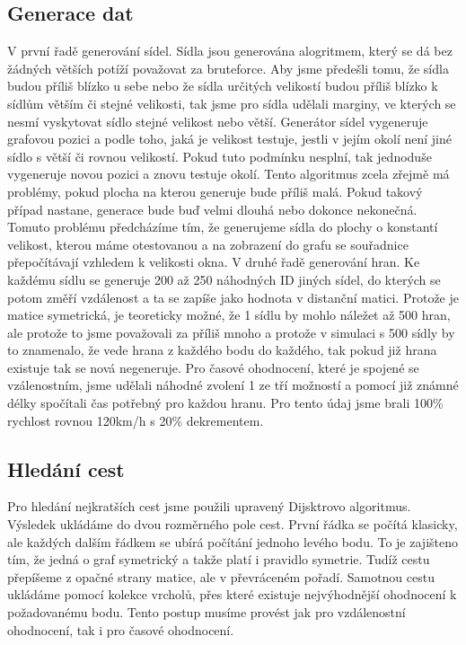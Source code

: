 \documentclass[ 12pt, a4paper]{article}
\begin{document}
\subsection{Generace dat}
V první řadě generování sídel. Sídla jsou generována alogritmem, který se dá bez žádných větších potíží považovat za bruteforce. Aby jsme předešli tomu, že sídla budou příliš blízko u sebe nebo že sídla určitých velikostí budou příliš blízko k sídlům větším či stejné velikosti, tak jsme pro sídla udělali marginy, ve kterých se nesmí vyskytovat sídlo stejné velikost nebo větší. Generátor sídel vygeneruje grafovou pozici a podle toho, jaká je velikost testuje, jestli v jejím okolí není jiné sídlo s větší či rovnou velikostí. Pokud tuto podmínku nesplní, tak jednoduše vygeneruje novou pozici a znovu testuje okolí. Tento algoritmus zcela zřejmě má problémy, pokud plocha na kterou generuje bude příliš malá. Pokud takový případ nastane, generace bude buď velmi dlouhá nebo dokonce nekonečná. Tomuto problému předcházíme tím, že generujeme sídla do plochy o konstantí velikost, kterou máme otestovanou a na zobrazení do grafu se souřadnice přepočítávají vzhledem k velikosti okna.\newline
V druhé řadě generování hran. Ke každému sídlu se generuje 200 až 250 náhodných ID jiných sídel, do kterých se potom změří vzdálenost a ta se zapíše jako hodnota v distanční matici. Protože je matice symetrická, je teoreticky možné, že 1 sídlu by mohlo náležet až 500 hran, ale protože to jsme považovali za příliš mnoho a protože v simulaci s 500 sídly by to znamenalo, že vede hrana z každého bodu do každého, tak pokud již hrana existuje tak se nová negeneruje. Pro časové ohodnocení, které je spojené se vzálenostním, jsme udělali náhodné zvolení 1 ze tří možností a pomocí již známné délky spočítali čas potřebný pro každou hranu. Pro tento údaj jsme brali 100\% rychlost rovnou 120km/h s 20\% dekrementem.\newline\newline
%
\subsection{Hledání cest}
Pro hledání nejkratších cest jsme použili upravený Dijsktrovo algoritmus. Výsledek ukládáme do dvou rozměrného pole cest. První řádka se počítá klasicky, ale každých dalším řádkem se ubírá počítání jednoho levého bodu. To je zajišteno tím, že jedná o graf symetrický a takže platí i pravidlo symetrie. Tudíž cestu přepíšeme z opačné strany matice, ale v převráceném pořadí. Samotnou cestu ukládáme pomocí kolekce vrcholů, přes které existuje nejvýhodnější ohodnocení k požadovanému bodu. Tento postup musíme provést jak pro vzdálenostní ohodnocení, tak i pro časové ohodnocení. 
\newline\newline
%
\end{document}
